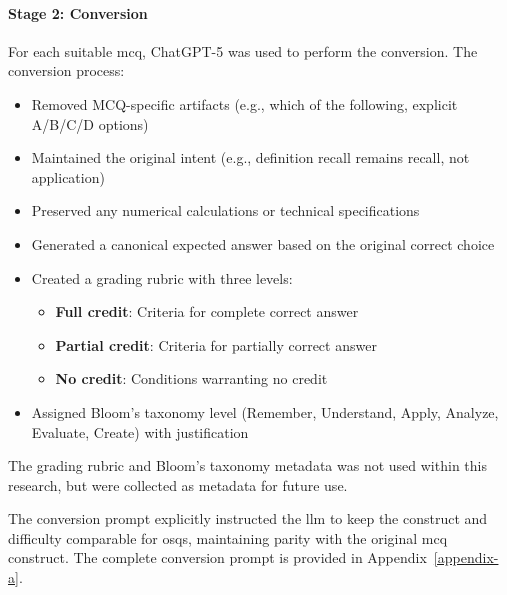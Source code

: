 \paragraph{Stage 2: Conversion}

For each suitable \ac{mcq}, ChatGPT-5 was used to perform the conversion. The conversion process:

\begin{itemize}
    \item Removed MCQ-specific artifacts (e.g., which of the following, explicit A/B/C/D options)
    \item Maintained the original intent (e.g., definition recall remains recall, not application)
    \item Preserved any numerical calculations or technical specifications
    \item Generated a canonical expected answer based on the original correct choice
    \item Created a grading rubric with three levels:
    \begin{itemize}
        \item \textbf{Full credit}: Criteria for complete correct answer
        \item \textbf{Partial credit}: Criteria for partially correct answer
        \item \textbf{No credit}: Conditions warranting no credit
    \end{itemize}
    \item Assigned Bloom's taxonomy level (Remember, Understand, Apply, Analyze, Evaluate, Create) with justification
\end{itemize}

The grading rubric and Bloom's taxonomy metadata was not used within this research, but were collected as metadata for
future use.

The conversion prompt explicitly instructed the \ac{llm} to keep the construct and difficulty comparable for \acp{osq}, maintaining parity with the original \ac{mcq} construct. The complete conversion prompt is provided in Appendix~\ref{appendix-a}.




